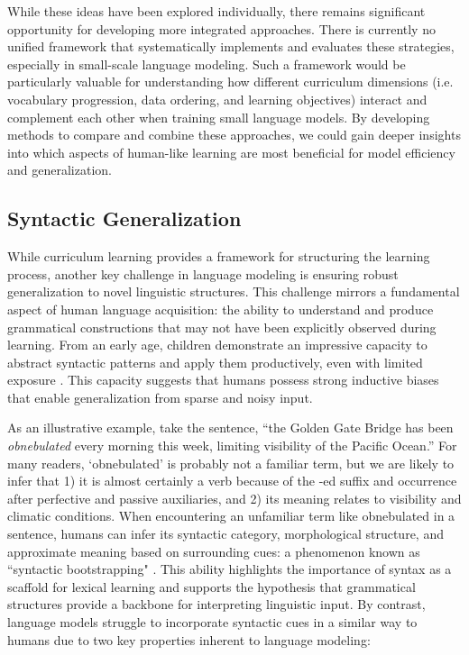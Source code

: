 \vspace{1em}

While these ideas have been explored individually, there remains significant opportunity for developing more integrated approaches. There is currently no unified framework that systematically implements and evaluates these strategies, especially in small-scale language modeling. Such a framework would be particularly valuable for understanding how different curriculum dimensions (i.e. vocabulary progression, data ordering, and learning objectives) interact and complement each other when training small language models. By developing methods to compare and combine these approaches, we could gain deeper insights into which aspects of human-like learning are most beneficial for model efficiency and generalization.

\subsection{Syntactic Generalization}

While curriculum learning provides a framework for structuring the learning process, another key challenge in language modeling is ensuring robust generalization to novel linguistic structures. This challenge mirrors a fundamental aspect of human language acquisition: the ability to understand and produce grammatical constructions that may not have been explicitly observed during learning. From an early age, children demonstrate an impressive capacity to abstract syntactic patterns and apply them productively, even with limited exposure \citep{yang2013poverty, legate2002empirical}. This capacity suggests that humans possess strong inductive biases that enable generalization from sparse and noisy input.

As an illustrative example, take the sentence, ``the Golden Gate Bridge has been \emph{obnebulated} every morning this week, limiting visibility of the Pacific Ocean.'' For many readers, `obnebulated' is probably not a familiar term, but we are likely to infer that 1) it is almost certainly a verb because of the -ed suffix and occurrence after perfective and passive auxiliaries, and 2) its meaning relates to visibility and climatic conditions. When encountering an unfamiliar term like obnebulated in a sentence, humans can infer its syntactic category, morphological structure, and approximate meaning based on surrounding cues: a phenomenon known as ``syntactic bootstrapping" \citep{gleitman1990structural, naigles1990children}. This ability highlights the importance of syntax as a scaffold for lexical learning and supports the hypothesis that grammatical structures provide a backbone for interpreting linguistic input. By contrast, language models struggle to incorporate syntactic cues in a similar way to humans due to two key properties inherent to language modeling:

